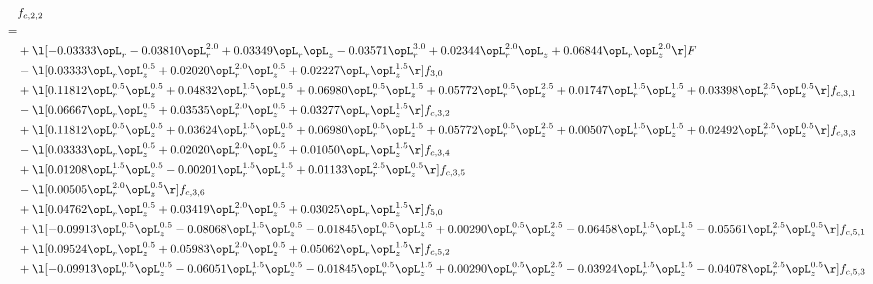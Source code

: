 \begin{alignat}{2} 
\label{eq:f_22_2} 
& f_{c,2,2} \nonumber \\ 
 = \\ 
& + \l[  -0.03333 \opL_r   -0.03810 \opL_r^{2.0} +  0.03349 \opL_r \opL_z   -0.03571 \opL_r^{3.0} +  0.02344 \opL_r^{2.0} \opL_z +  0.06844 \opL_r \opL_z^{2.0}  \r] F \nonumber \\ 
& - \l[  0.03333 \opL_r \opL_z^{0.5} +  0.02020 \opL_r^{2.0} \opL_z^{0.5} +  0.02227 \opL_r \opL_z^{1.5}  \r] f_{3,0} \nonumber \\ 
& + \l[  0.11812 \opL_r^{0.5} \opL_z^{0.5} +  0.04832 \opL_r^{1.5} \opL_z^{0.5} +  0.06980 \opL_r^{0.5} \opL_z^{1.5} +  0.05772 \opL_r^{0.5} \opL_z^{2.5} +  0.01747 \opL_r^{1.5} \opL_z^{1.5} +  0.03398 \opL_r^{2.5} \opL_z^{0.5}  \r] f_{c,3,1} \nonumber \\ 
& - \l[  0.06667 \opL_r \opL_z^{0.5} +  0.03535 \opL_r^{2.0} \opL_z^{0.5} +  0.03277 \opL_r \opL_z^{1.5}  \r] f_{c,3,2} \nonumber \\ 
& + \l[  0.11812 \opL_r^{0.5} \opL_z^{0.5} +  0.03624 \opL_r^{1.5} \opL_z^{0.5} +  0.06980 \opL_r^{0.5} \opL_z^{1.5} +  0.05772 \opL_r^{0.5} \opL_z^{2.5} +  0.00507 \opL_r^{1.5} \opL_z^{1.5} +  0.02492 \opL_r^{2.5} \opL_z^{0.5}  \r] f_{c,3,3} \nonumber \\ 
& - \l[  0.03333 \opL_r \opL_z^{0.5} +  0.02020 \opL_r^{2.0} \opL_z^{0.5} +  0.01050 \opL_r \opL_z^{1.5}  \r] f_{c,3,4} \nonumber \\ 
& + \l[  0.01208 \opL_r^{1.5} \opL_z^{0.5}   -0.00201 \opL_r^{1.5} \opL_z^{1.5} +  0.01133 \opL_r^{2.5} \opL_z^{0.5}  \r] f_{c,3,5} \nonumber \\ 
& - \l[  0.00505 \opL_r^{2.0} \opL_z^{0.5}  \r] f_{c,3,6} \nonumber \\ 
& + \l[  0.04762 \opL_r \opL_z^{0.5} +  0.03419 \opL_r^{2.0} \opL_z^{0.5} +  0.03025 \opL_r \opL_z^{1.5}  \r] f_{5,0} \nonumber \\ 
& + \l[  -0.09913 \opL_r^{0.5} \opL_z^{0.5}   -0.08068 \opL_r^{1.5} \opL_z^{0.5}   -0.01845 \opL_r^{0.5} \opL_z^{1.5} +  0.00290 \opL_r^{0.5} \opL_z^{2.5}   -0.06458 \opL_r^{1.5} \opL_z^{1.5}   -0.05561 \opL_r^{2.5} \opL_z^{0.5}  \r] f_{c,5,1} \nonumber \\ 
& + \l[  0.09524 \opL_r \opL_z^{0.5} +  0.05983 \opL_r^{2.0} \opL_z^{0.5} +  0.05062 \opL_r \opL_z^{1.5}  \r] f_{c,5,2} \nonumber \\ 
& + \l[  -0.09913 \opL_r^{0.5} \opL_z^{0.5}   -0.06051 \opL_r^{1.5} \opL_z^{0.5}   -0.01845 \opL_r^{0.5} \opL_z^{1.5} +  0.00290 \opL_r^{0.5} \opL_z^{2.5}   -0.03924 \opL_r^{1.5} \opL_z^{1.5}   -0.04078 \opL_r^{2.5} \opL_z^{0.5}  \r] f_{c,5,3} \nonumber \\ 

\end{alignat}
